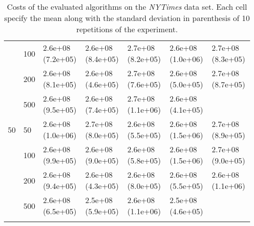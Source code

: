 \begin{longtable}{lllllll}
   & 100 &  2.6e+08 (7.2e+05) &  2.6e+08 (8.4e+05) &  2.7e+08 (8.2e+05) &    2.6e+08 (1.0e+06) &  2.7e+08 (8.3e+05) \\
   & 200 &  2.6e+08 (8.1e+05) &  2.6e+08 (4.6e+05) &  2.7e+08 (7.6e+05) &    2.6e+08 (5.0e+05) &  2.7e+08 (8.7e+05) \\
   & 500 &  2.6e+08 (9.5e+05) &  2.6e+08 (7.4e+05) &  2.7e+08 (1.1e+06) &    2.6e+08 (4.1e+05) &       \\
 \midrule
50 & 50  &  2.6e+08 (1.0e+06) &  2.7e+08 (8.0e+05) &  2.6e+08 (5.5e+05) &    2.6e+08 (1.5e+06) &  2.7e+08 (8.9e+05) \\
   & 100 &  2.6e+08 (9.9e+05) &  2.6e+08 (9.0e+05) &  2.6e+08 (5.8e+05) &    2.6e+08 (1.5e+06) &  2.7e+08 (9.0e+05) \\
   & 200 &  2.6e+08 (9.4e+05) &  2.6e+08 (4.3e+05) &  2.6e+08 (8.0e+05) &    2.6e+08 (5.5e+05) &  2.6e+08 (1.1e+06) \\
   & 500 &  2.6e+08 (6.5e+05) &  2.5e+08 (5.9e+05) &  2.6e+08 (1.1e+06) &    2.5e+08 (4.6e+05) &                 \\
\bottomrule
\caption{Costs of the evaluated algorithms on the \textit{NYTimes} data set. Each cell specify the mean along with the standard deviation in parenthesis of 10 repetitions of the experiment.}
\label{tab:real-cost-mean-std-nytimes}
\end{longtable}

